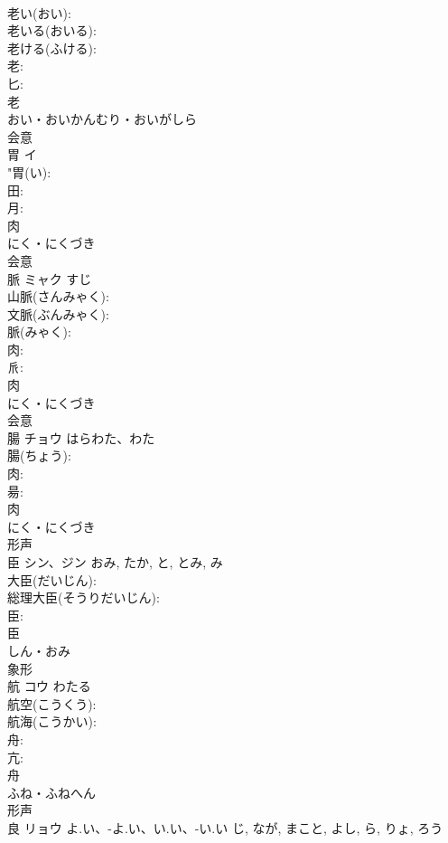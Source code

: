 \documentclass[8pt]{extreport}
\begin{document}
\begin{CJK}{UTF8}{min}
\\	老い(おい): 
\\	老いる(おいる): 
\\	老ける(ふける): 
\\	老: 
\\	匕: 
\\	老	
\\	おい・おいかんむり・おいがしら	
\\	会意 
\\	胃	イ			
\\	"胃(い): 
\\	田: 
\\	月: 
\\	肉	
\\	にく・にくづき	
\\	会意 
\\	脈	ミャク	すじ		
\\	山脈(さんみゃく): 
\\	文脈(ぶんみゃく): 
\\	脈(みゃく): 
\\	肉: 
\\	𠂢: 
\\	肉	
\\	にく・にくづき	
\\	会意 
\\	腸	チョウ	はらわた、わた		
\\	腸(ちょう): 
\\	肉: 
\\	昜: 
\\	肉	
\\	にく・にくづき	
\\	形声 
\\	臣	シン、ジン		おみ, たか, と, とみ, み	
\\	大臣(だいじん): 
\\	総理大臣(そうりだいじん): 
\\	臣: 
\\	臣	
\\	しん・おみ	
\\	象形 
\\	航	コウ		わたる	
\\	航空(こうくう): 
\\	航海(こうかい): 
\\	舟: 
\\	亢: 
\\	舟	
\\	ふね・ふねへん	
\\	形声 
\\	良	リョウ	よ.い、-よ.い、い.い、-い.い	じ, なが, まこと, よし, ら, りょ, ろう	

\end{CJK}
\end{document}
